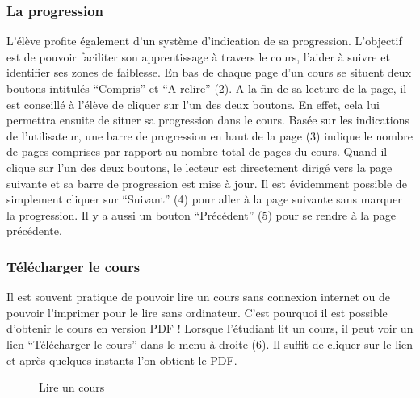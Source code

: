 \documentclass[a4paper,10pt,twoside]{sphinxmanual}
\begin{document}
\subsubsection{La progression}
\label{functionalities:la-progression}
L'élève profite également d'un système d'indication de sa progression. L'objectif est de pouvoir faciliter son apprentissage à travers le cours, l'aider à suivre et identifier ses zones de faiblesse. En bas de chaque page d'un cours se situent deux boutons intitulés ``Compris'' et ``A relire'' (2). A la fin de sa lecture de la page, il est conseillé à l'élève de cliquer sur l'un des deux boutons. En effet, cela lui permettra ensuite de situer sa progression dans le cours. Basée sur les indications de l'utilisateur, une barre de progression en haut de la page (3) indique le nombre de pages comprises par rapport au nombre total de pages du cours. Quand il clique sur l'un des deux boutons, le lecteur est directement dirigé vers la page suivante et sa barre de progression est mise à jour. Il est évidemment possible de simplement cliquer sur ``Suivant'' (4) pour aller à la page suivante sans marquer la progression. Il y a aussi un bouton ``Précédent'' (5) pour se rendre à la page précédente.


\subsubsection{Télécharger le cours}
\label{functionalities:telecharger-le-cours}
Il est souvent pratique de pouvoir lire un cours sans connexion internet ou de pouvoir l'imprimer pour le lire sans ordinateur. C'est pourquoi il est possible d'obtenir le cours en version PDF ! Lorsque l'étudiant lit un cours, il peut voir un lien ``Télécharger le cours'' dans le menu à droite (6). Il suffit de cliquer sur le lien et après quelques instants l'on obtient le PDF.
\begin{figure}[htbp]
\centering
\capstart

\caption{Lire un cours}\end{figure}
\end{document}
